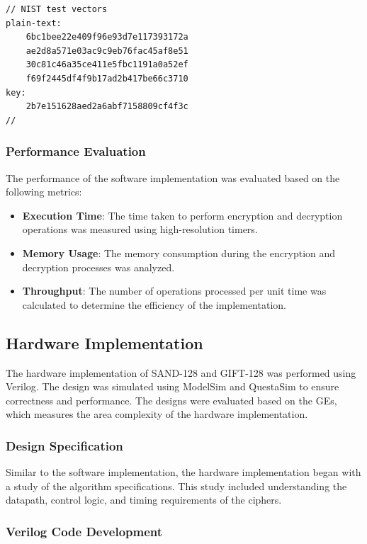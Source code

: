 \documentclass[conference]{IEEEtran}
\begin{document}
\begin{verbatim}
// NIST test vectors
plain-text:
    6bc1bee22e409f96e93d7e117393172a
    ae2d8a571e03ac9c9eb76fac45af8e51
    30c81c46a35ce411e5fbc1191a0a52ef
    f69f2445df4f9b17ad2b417be66c3710
key:
    2b7e151628aed2a6abf7158809cf4f3c
//
\end{verbatim}

\subsubsection{Performance Evaluation}

The performance of the software implementation was evaluated based on the following metrics:

\begin{itemize}
    \item \textbf{Execution Time}: The time taken to perform encryption and decryption operations was measured using high-resolution timers.
    \item \textbf{Memory Usage}: The memory consumption during the encryption and decryption processes was analyzed.
    \item \textbf{Throughput}: The number of operations processed per unit time was calculated to determine the efficiency of the implementation.
\end{itemize}

\subsection{Hardware Implementation}

The hardware implementation of SAND-128 and GIFT-128 was performed using Verilog. The design was simulated using ModelSim and QuestaSim to ensure correctness and performance. The designs were evaluated based on the GEs, which measures the area complexity of the hardware implementation.

\subsubsection{Design Specification}

Similar to the software implementation, the hardware implementation began with a study of the algorithm specifications. This study included understanding the datapath, control logic, and timing requirements of the ciphers.

\subsubsection{Verilog Code Development}
\end{document}
